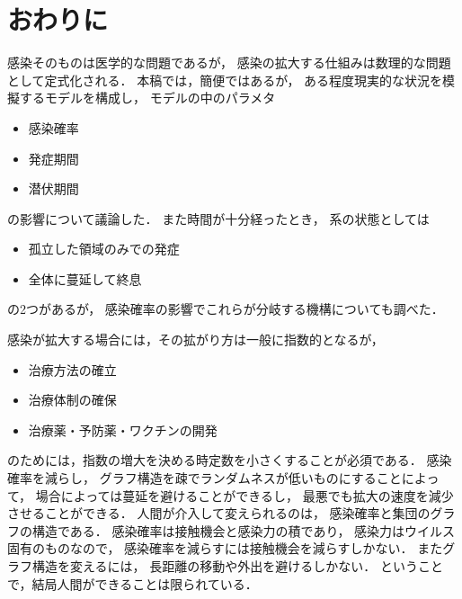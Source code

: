 \documentclass[10pt,oneside]{scrartcl}
\begin{document}
\section{おわりに}
\label{sec:org55b8e7e}

感染そのものは医学的な問題であるが，
感染の拡大する仕組みは数理的な問題として定式化される．
本稿では，簡便ではあるが，
ある程度現実的な状況を模擬するモデルを構成し，
モデルの中のパラメタ
\begin{itemize}
\item 感染確率
\item 発症期間
\item 潜伏期間
\end{itemize}
の影響について議論した．
また時間が十分経ったとき，
系の状態としては
\begin{itemize}
\item 孤立した領域のみでの発症
\item 全体に蔓延して終息
\end{itemize}
の2つがあるが，
感染確率の影響でこれらが分岐する機構についても調べた．

感染が拡大する場合には，その拡がり方は一般に指数的となるが，
\begin{itemize}
\item 治療方法の確立
\item 治療体制の確保
\item 治療薬・予防薬・ワクチンの開発
\end{itemize}
のためには，指数の増大を決める時定数を小さくすることが必須である．
感染確率を減らし，
グラフ構造を疎でランダムネスが低いものにすることによって，
場合によっては蔓延を避けることができるし，
最悪でも拡大の速度を減少させることができる．
人間が介入して変えられるのは，
感染確率と集団のグラフの構造である．
感染確率は接触機会と感染力の積であり，
感染力はウイルス固有のものなので，
感染確率を減らすには接触機会を減らすしかない．
またグラフ構造を変えるには，
長距離の移動や外出を避けるしかない．
ということで，結局人間ができることは限られている．
\end{document}
